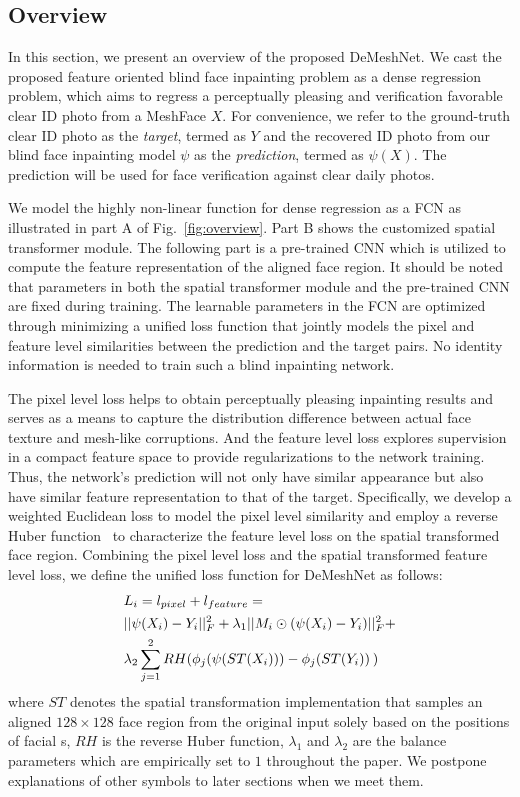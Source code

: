 \documentclass[10pt,twocolumn,letterpaper]{article}
\begin{document}
\subsection{Overview}
In this section, we present an overview of the proposed DeMeshNet. We cast the proposed feature oriented blind face inpainting problem as a dense regression problem, which aims to regress a perceptually pleasing and verification favorable clear ID photo from a MeshFace $X$. For convenience, we refer to the ground-truth clear ID photo as the \textit{target}, termed as $Y$  and the recovered ID photo from our blind face inpainting model $\psi$ as the \textit{prediction}, termed as $\psi ({X})$. The prediction will be used for face verification against clear daily photos.

We model the highly non-linear function for dense regression as a FCN as illustrated in part A of Fig.~\ref{fig:overview}. Part B shows the customized spatial transformer module. The following part is a pre-trained CNN which is utilized to compute the feature representation of the aligned face region. It should be noted that parameters in both the spatial transformer module and the pre-trained CNN are fixed during training. The learnable parameters in the FCN are optimized through minimizing a unified loss function that jointly models the pixel and feature level similarities between the prediction and the target pairs. No identity information is needed to train such a blind inpainting network.


The pixel level loss helps to obtain perceptually pleasing inpainting results and serves as a means to capture the distribution difference between actual face texture and mesh-like corruptions. And the feature level loss explores supervision in a compact feature space to provide regularizations to the network training. Thus, the network's prediction will not only have similar appearance but also have similar feature representation to that of the target. Specifically, we develop a weighted Euclidean loss to model the pixel level similarity and employ a reverse Huber function~\cite{laina2016deeper} to characterize the feature level loss on the spatial transformed face region. Combining the pixel level loss and the spatial transformed feature level loss, we define the unified loss function for DeMeshNet as follows:
\begin{equation}
\begin{split}
&{L_i} = l_{pixel} + {l_{feature}} = \\
&||\psi ({X_i} ) - {Y_i}||_F^2 + \lambda_1 ||{M_i} \odot (\psi ({X_i} ) - {Y_i})||_F^2+\\
 &\lambda_2\sum\limits_{j=1}^2 {RH({\phi _j}(\psi ({ST(X_i)})) - {\phi _j}({ST(Y_i)})} {\kern 1pt} {\kern 1pt} )
\end{split}\label{eq:first}
\end{equation}
where $ST$ denotes the spatial transformation implementation that samples an aligned $128\times 128$ face region from the original input solely based on the positions of facial
s, $RH$ is the reverse Huber function, $\lambda_1$ and $\lambda_2$ are the balance parameters which are empirically set to $1$ throughout the paper. We postpone explanations of other symbols to later sections when we meet them.
\end{document}
